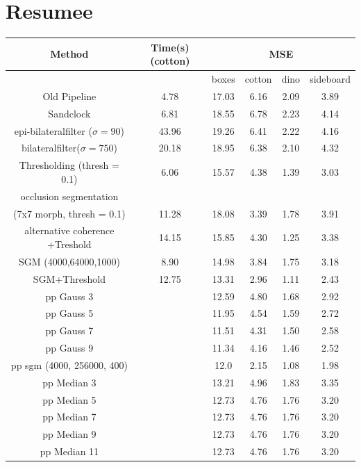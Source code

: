 \documentclass  [
  paper    = a4,
  BCOR     = 10mm,
  twoside,
  fontsize = 12pt,
  fleqn,
  toc      = bibnumbered,
  toc      = listofnumbered,
  numbers  = noendperiod,
  headings = normal,
  listof   = leveldown,
  version  = 3.03
]                                       {scrreprt}
\begin{document}
\section{Resumee}
\begin{table}
	\begin{tabular}{|c|c|c|c|c|c|}
		\hline 
		Method & Time(s) (cotton) & \multicolumn{4}{c|}{MSE} \\ 
		\hline 
		&  & boxes & cotton & dino & sideboard \\ 
		\hline
		Old Pipeline & 4.78 & 17.03 & 6.16 & 2.09 & 3.89 \\
		\hline 
		Sandclock & 6.81  & 18.55  & 6.78  & 2.23  & 4.14 \\ 
		\hline 
		epi-bilateralfilter ($\sigma = 90$) &  43.96 &  19.26  & 6.41  & 2.22  & 4.16  \\ 
		\hline 
		bilateralfilter($\sigma = 750$) & 20.18  & 18.95  &  6.38 & 2.10  &4.32  \\ 
		\hline 
		Thresholding (thresh = 0.1) & 6.06 & 15.57  & 4.38  & 1.39  & 3.03  \\ 
		\hline 
		occlusion segmentation\\(7x7 morph, thresh = 0.1) & 11.28  & 18.08 &  3.39 & 1.78  & 3.91  \\ 
		\hline 
		alternative coherence +Treshold & 14.15  & 15.85  & 4.30  & 1.25  & 3.38  \\ 
		\hline 
		SGM (4000,64000,1000) & 8.90 & 14.98  & 3.84  & 1.75  & 3.18  \\ 
		\hline 
		SGM+Threshold & 12.75  & 13.31  & 2.96   & 1.11   & 2.43 \\ 
		\hline 
		\hline
		pp Gauss 3 & & 12.59 & 4.80 & 1.68 & 2.92 \\
		\hline
		pp Gauss 5 & & 11.95 & 4.54 & 1.59 &  2.72 \\
		\hline 
		pp Gauss 7 & & 11.51 & 4.31 & 1.50 & 2.58 \\
		\hline
		pp Gauss 9 & & 11.34 & 4.16 & 1.46 & 2.52 \\
		\hline
		pp sgm (4000, 256000, 400) & &12.0 & 2.15 & 1.08 & 1.98\\
		\hline
		pp Median 3 & & 13.21 & 4.96 & 1.83 & 3.35 \\
		\hline
		pp Median 5 & & 12.73 & 4.76 & 1.76 & 3.20 \\
		\hline
		pp Median 7 & & 12.73 & 4.76 & 1.76 & 3.20 \\
		\hline 
		pp Median 9 & & 12.73 & 4.76 & 1.76 &3.20 \\
		\hline 
		pp Median 11 & & 12.73 & 4.76 & 1.76 &3.20 \\
	\end{tabular} 
\end{table}
\end{document}
